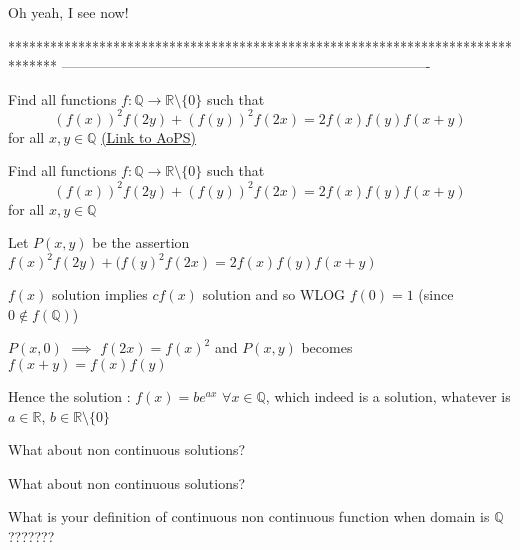 \begin{solution}
	Oh yeah, I see now!
\end{solution}
*******************************************************************************
-------------------------------------------------------------------------------

\begin{problem}
	Find all functions $f:\mathbb{Q}\rightarrow\mathbb{R} \setminus \{ 0 \}$ such that 
\[(f(x))^2f(2y)+(f(y))^2f(2x)=2f(x)f(y)f(x+y)\]
for all $x,y\in\mathbb{Q}$
	\flushright \href{https://artofproblemsolving.com/community/c6h1113618}{(Link to AoPS)}
\end{problem}



\begin{solution}
	\begin{tcolorbox}Find all functions $f:\mathbb{Q}\rightarrow\mathbb{R} \setminus \{ 0 \}$ such that 
\[(f(x))^2f(2y)+(f(y))^2f(2x)=2f(x)f(y)f(x+y)\]
for all $x,y\in\mathbb{Q}$\end{tcolorbox}

Let $P(x,y)$ be the assertion $f(x)^2f(2y)+(f(y)^2f(2x)=2f(x)f(y)f(x+y)$

$f(x)$ solution implies $cf(x)$ solution and so WLOG $f(0)=1$ (since $0\notin f(\mathbb Q)$)

$P(x,0)$ $\implies$  $f(2x)=f(x)^2$ and $P(x,y)$ becomes $f(x+y)=f(x)f(y)$

Hence the solution : $\boxed{f(x)=b e^{ax}}$ $\forall x\in\mathbb Q$, which indeed is a solution, whatever is $a\in\mathbb R$, $b\in\mathbb R\setminus\{0\}$


\end{solution}



\begin{solution}
	What about non continuous solutions?
\end{solution}



\begin{solution}
	\begin{tcolorbox}What about non continuous solutions?\end{tcolorbox}

What is your definition of continuous \/ non continuous function when domain is $\mathbb Q$ ???????
\end{solution}



